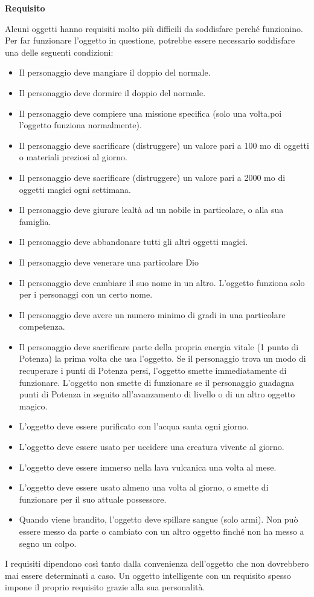 \documentclass[a4paper,11pt,twoside,openany]{book}
\begin{document}
\textbf{Requisito}

Alcuni oggetti hanno requisiti molto più difficili da soddisfare perché funzionino. Per far funzionare l'oggetto in questione, potrebbe essere necessario soddisfare una delle seguenti condizioni:
\begin{itemize}
	\item Il personaggio deve mangiare il doppio del normale.
	\item Il personaggio deve dormire il doppio del normale.
	\item Il personaggio deve compiere una missione specifica (solo una volta,poi l'oggetto funziona normalmente).
	\item Il personaggio deve sacrificare (distruggere) un valore pari a 100 mo di oggetti o materiali preziosi al giorno.
	\item Il personaggio deve sacrificare (distruggere) un valore pari a 2000 mo di oggetti magici ogni settimana.
	\item Il personaggio deve giurare lealtà ad un nobile in particolare, o alla sua famiglia.
	\item Il personaggio deve abbandonare tutti gli altri oggetti magici.
	\item Il personaggio deve venerare una particolare Dio
	\item Il personaggio deve cambiare il suo nome in un altro. L'oggetto funziona solo per i personaggi con un certo nome.
	\item Il personaggio deve avere un numero minimo di gradi in una particolare competenza.
	\item Il personaggio deve sacrificare parte della propria energia vitale (1 punto di Potenza) la prima volta che usa l'oggetto. Se il personaggio trova un modo di recuperare i punti di Potenza persi, l'oggetto smette immediatamente di funzionare. L'oggetto non smette di funzionare se il personaggio guadagna punti di Potenza in seguito all'avanzamento di livello o di un altro oggetto magico.
	\item L'oggetto deve essere purificato con l'acqua santa ogni giorno.
	\item L'oggetto deve essere usato per uccidere una creatura vivente al giorno.
	\item L'oggetto deve essere immerso nella lava vulcanica una volta al mese.
	\item L'oggetto deve essere usato almeno una volta al giorno, o smette di funzionare per il suo attuale possessore.
	\item Quando viene brandito, l'oggetto deve spillare sangue (solo armi). Non può essere messo da parte o cambiato con un altro oggetto finché non ha messo a segno un colpo.
\end{itemize}
I requisiti dipendono così tanto dalla convenienza dell'oggetto che non dovrebbero mai essere determinati a caso. Un oggetto intelligente con un requisito spesso impone il proprio requisito grazie alla sua personalità.
\end{document}
